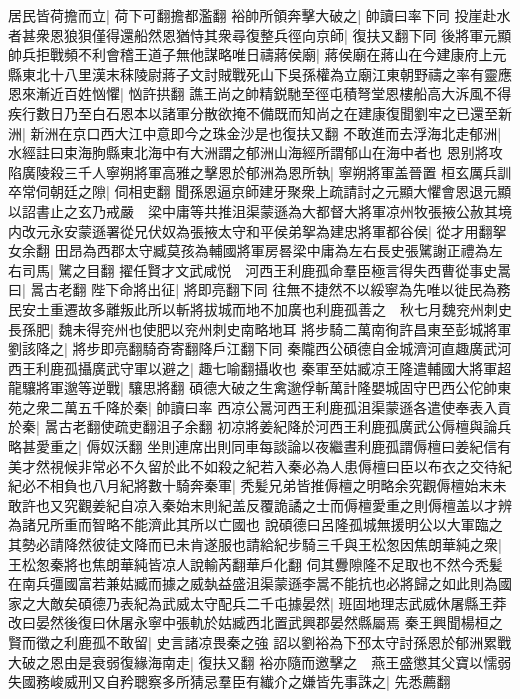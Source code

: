 居民皆荷擔而立|{
	荷下可翻擔都濫翻}
裕帥所領奔擊大破之|{
	帥讀曰率下同}
投崖赴水者甚衆恩狼狽僅得還船然恩猶恃其衆尋復整兵徑向京師|{
	復扶又翻下同}
後將軍元顯帥兵拒戰頻不利會稽王道子無他謀略唯日禱蔣侯廟|{
	蔣侯廟在蔣山在今建康府上元縣東北十八里漢末秣陵尉蔣子文討賊戰死山下吳孫權為立廟江東朝野禱之率有靈應}
恩來漸近百姓忷懼|{
	忷許拱翻}
譙王尚之帥精鋭馳至徑屯積弩堂恩樓船高大泝風不得疾行數日乃至白石恩本以諸軍分散欲掩不備既而知尚之在建康復聞劉牢之已還至新洲|{
	新洲在京口西大江中意即今之珠金沙是也復扶又翻}
不敢進而去浮海北走郁洲|{
	水經註曰束海朐縣東北海中有大洲謂之郁洲山海經所謂郁山在海中者也}
恩别將攻陷廣陵殺三千人寧朔將軍高雅之擊恩於郁洲為恩所執|{
	寧朔將軍盖晉置}
桓玄厲兵訓卒常伺朝廷之隙|{
	伺相吏翻}
聞孫恩逼京師建牙聚衆上疏請討之元顯大懼會恩退元顯以詔書止之玄乃戒嚴　梁中庸等共推沮渠蒙遜為大都督大將軍凉州牧張掖公赦其境内改元永安蒙遜署從兄伏奴為張掖太守和平侯弟挐為建忠將軍都谷侯|{
	從才用翻挐女余翻}
田昂為西郡太守臧莫孩為輔國將軍房晷梁中庸為左右長史張騭謝正禮為左右司馬|{
	騭之目翻}
擢任賢才文武咸悦　河西王利鹿孤命羣臣極言得失西曹從事史暠曰|{
	暠古老翻}
陛下命將出征|{
	將即亮翻下同}
往無不捷然不以綏寧為先唯以徙民為務民安土重遷故多離叛此所以斬將拔城而地不加廣也利鹿孤善之　秋七月魏兖州刺史長孫肥|{
	魏未得兖州也使肥以兖州刺史南略地耳}
將步騎二萬南徇許昌東至彭城將軍劉該降之|{
	將步即亮翻騎奇寄翻降戶江翻下同}
秦隴西公碩德自金城濟河直趣廣武河西王利鹿孤攝廣武守軍以避之|{
	趣七喻翻攝收也}
秦軍至姑臧凉王隆遣輔國大將軍超龍驤將軍邈等逆戰|{
	驤思將翻}
碩德大破之生禽邈俘斬萬計隆嬰城固守巴西公佗帥東苑之衆二萬五千降於秦|{
	帥讀曰率}
西凉公暠河西王利鹿孤沮渠蒙遜各遣使奉表入貢於秦|{
	暠古老翻使疏吏翻沮子余翻}
初凉將姜紀降於河西王利鹿孤廣武公傉檀與論兵略甚愛重之|{
	傉奴沃翻}
坐則連席出則同車每談論以夜繼晝利鹿孤謂傉檀曰姜紀信有美才然視候非常必不久留於此不如殺之紀若入秦必為人患傉檀曰臣以布衣之交待紀紀必不相負也八月紀將數十騎奔秦軍|{
	秃髪兄弟皆推傉檀之明略余究觀傉檀始末未敢許也又究觀姜紀自凉入秦始末則紀盖反覆詭譎之士而傉檀愛重之則傉檀盖以才辨為諸兄所重而智略不能濟此其所以亡國也}
說碩德曰呂隆孤城無援明公以大軍臨之其勢必請降然彼徒文降而已未肯遂服也請給紀步騎三千與王松怱因焦朗華純之衆|{
	王松怱秦將也焦朗華純皆凉人說輸芮翻華戶化翻}
伺其釁隙隆不足取也不然今秃髪在南兵彊國富若兼姑臧而據之威埶益盛沮渠蒙遜李暠不能抗也必將歸之如此則為國家之大敵矣碩德乃表紀為武威太守配兵二千屯據晏然|{
	班固地理志武威休屠縣王莽改曰晏然後復曰休屠永寧中張軌於姑臧西北置武興郡晏然縣屬焉}
秦王興聞楊桓之賢而徵之利鹿孤不敢留|{
	史言諸凉畏秦之強}
詔以劉裕為下邳太守討孫恩於郁洲累戰大破之恩由是衰弱復緣海南走|{
	復扶又翻}
裕亦隨而邀擊之　燕王盛懲其父寶以懦弱失國務峻威刑又自矜聰察多所猜忌羣臣有纎介之嫌皆先事誅之|{
	先悉薦翻}

